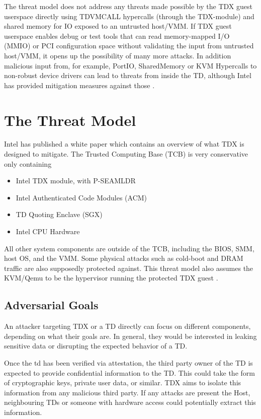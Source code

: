 The threat model does not address any threats made possible by the TDX guest userspace directly using TDVMCALL hypercalls (through the TDX-module) and shared memory for IO exposed to an untrusted host/VMM. If TDX guest userspace enables debug or test tools that can read memory-mapped I/O (MMIO) or PCI configuration space without validating the input from untrusted host/VMM, it opens up the possibility of many more attacks. In addition malicious input from, for example,  PortIO, SharedMemory or KVM Hypercalls to non-robust device drivers can lead to threats from inside the TD, although Intel has provided mitigation measures against those \cite{linux-guest-hardening}.

\section{The Threat Model}

Intel has published a white paper \cite{noauthor_tdx-whitepaper-february2022pdf_nodate} which contains an overview of what TDX is designed to mitigate. The Trusted Computing Base (TCB) is very conservative only containing 
\begin{itemize}
    \item Intel TDX module, with \Gls{P-SEAMLDR}
    \item Intel Authenticated Code Modules (ACM)
    \item TD Quoting Enclave (SGX)
    \item Intel CPU Hardware
\end{itemize}
All other system components are outside of the TCB, including the BIOS, SMM, host OS, and the VMM. Some physical attacks such as cold-boot and DRAM traffic are also supposedly protected against. This threat model also assumes the KVM/Qemu to be the hypervisor running the protected TDX guest \cite{aktas_intel_nodate}.

\subsection{Adversarial Goals}
An attacker targeting TDX or a TD directly can focus on different components, depending on what their goals are. In general, they would be interested in leaking sensitive data or disrupting the expected behavior of a TD.


Once the td has been verified via attestation, the third party owner of the TD is expected to provide confidential information to the TD. This could take the form of cryptographic keys, private user data, or similar. TDX aims to isolate this information from any malicious third party. If any attacks are present the Host, neighbouring TDs or someone with hardware access could potentially extract this information.

